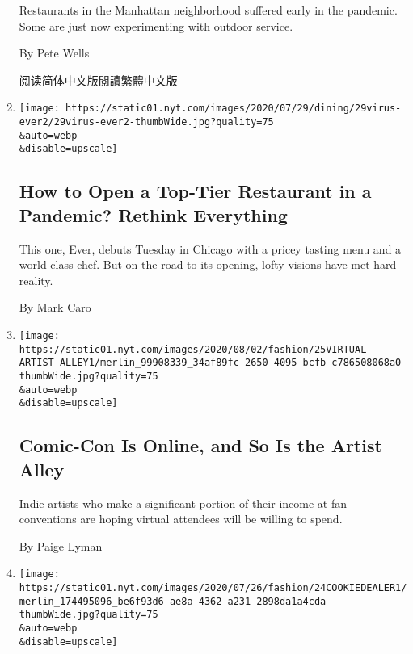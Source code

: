 \begin{enumerate}
  Restaurants in the Manhattan neighborhood suffered early in the
  pandemic. Some are just now experimenting with outdoor service.

  By Pete Wells

  \href{https://cn.nytimes.com/style/20200804/chinatown-outdoor-dining-coronavirus/}{阅读简体中文版}\href{https://cn.nytimes.com/style/20200804/chinatown-outdoor-dining-coronavirus/zh-hant/}{閱讀繁體中文版}
\item
  \href{/2020/07/28/dining/ever-chicago-restaurant-coronavirus.html}{}

  \texttt{[image: https://static01.nyt.com/images/2020/07/29/dining/29virus-ever2/29virus-ever2-thumbWide.jpg?quality=75\\\&auto=webp\\\&disable=upscale]}

  \hypertarget{how-to-open-a-top-tier-restaurant-in-a-pandemic-rethink-everything}{%
  \subsection{How to Open a Top-Tier Restaurant in a Pandemic? Rethink
  Everything}\label{how-to-open-a-top-tier-restaurant-in-a-pandemic-rethink-everything}}

  This one, Ever, debuts Tuesday in Chicago with a pricey tasting menu
  and a world-class chef. But on the road to its opening, lofty visions
  have met hard reality.

  By Mark Caro
\item
  \href{/2020/07/25/style/comic-con-online-artist-alley.html}{}

  \texttt{[image: https://static01.nyt.com/images/2020/08/02/fashion/25VIRTUAL-ARTIST-ALLEY1/merlin\_99908339\_34af89fc-2650-4095-bcfb-c786508068a0-thumbWide.jpg?quality=75\\\&auto=webp\\\&disable=upscale]}

  \hypertarget{comic-con-is-online-and-so-is-the-artist-alley}{%
  \subsection{Comic-Con Is Online, and So Is the Artist
  Alley}\label{comic-con-is-online-and-so-is-the-artist-alley}}

  Indie artists who make a significant portion of their income at fan
  conventions are hoping virtual attendees will be willing to spend.

  By Paige Lyman
\item
  \href{/2020/07/24/style/my-cookie-dealer-instagram.html}{}

  \texttt{[image: https://static01.nyt.com/images/2020/07/26/fashion/24COOKIEDEALER1/merlin\_174495096\_be6f93d6-ae8a-4362-a231-2898da1a4cda-thumbWide.jpg?quality=75\\\&auto=webp\\\&disable=upscale]}


\end{enumerate}
